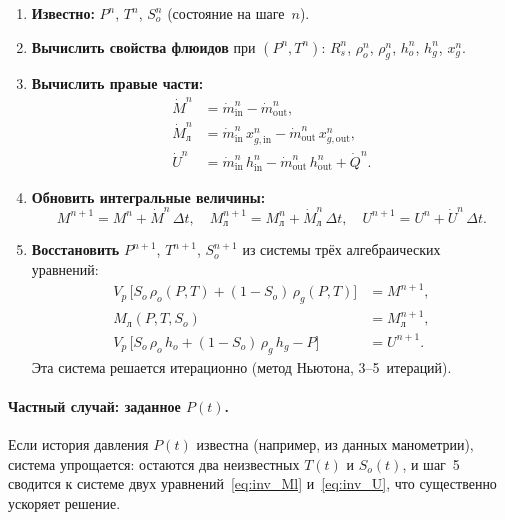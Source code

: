 \documentclass[12pt,a4paper]{article}
\begin{document}
\begin{enumerate}
  \item \textbf{Известно:} $P^n$, $T^n$, $S_o^n$ (состояние на шаге~$n$).

  \item \textbf{Вычислить свойства флюидов} при $(P^n, T^n)$:
        $R_s^n$, $\rho_o^n$, $\rho_g^n$, $h_o^n$, $h_g^n$, $x_g^n$.

  \item \textbf{Вычислить правые части:}
    \begin{align}
      \dot{M}^n &= \dot{m}_{\text{in}}^n - \dot{m}_{\text{out}}^n,
        \label{eq:rhs_M} \\
      \dot{M}_{\text{л}}^n &= \dot{m}_{\text{in}}^n\,x_{g,\text{in}}^n
        - \dot{m}_{\text{out}}^n\,x_{g,\text{out}}^n,
        \label{eq:rhs_Ml} \\
      \dot{U}^n &= \dot{m}_{\text{in}}^n\,h_{\text{in}}^n
        - \dot{m}_{\text{out}}^n\,h_{\text{out}}^n + \dot{Q}^n.
        \label{eq:rhs_U}
    \end{align}

  \item \textbf{Обновить интегральные величины:}
    \begin{equation}\label{eq:euler}
      M^{n+1} = M^n + \dot{M}^n\,\Delta t, \quad
      M_{\text{л}}^{n+1} = M_{\text{л}}^n + \dot{M}_{\text{л}}^n\,\Delta t, \quad
      U^{n+1} = U^n + \dot{U}^n\,\Delta t.
    \end{equation}

  \item \textbf{Восстановить} $P^{n+1}$, $T^{n+1}$, $S_o^{n+1}$ из
        системы трёх алгебраических уравнений:
    \begin{align}
      V_p\,\bigl[S_o\,\rho_o(P,T) + (1-S_o)\,\rho_g(P,T)\bigr] &= M^{n+1},
        \label{eq:inv_M} \\
      M_{\text{л}}(P,T,S_o) &= M_{\text{л}}^{n+1},
        \label{eq:inv_Ml} \\
      V_p\,\bigl[S_o\,\rho_o\,h_o + (1-S_o)\,\rho_g\,h_g - P\bigr] &= U^{n+1}.
        \label{eq:inv_U}
    \end{align}
        Эта система решается итерационно (метод Ньютона, 3--5~итераций).
\end{enumerate}

\paragraph{Частный случай: заданное $P(t)$.}
Если история давления $P(t)$ известна (например, из данных манометрии),
система упрощается: остаются два неизвестных $T(t)$ и $S_o(t)$,
и шаг~5 сводится к системе двух уравнений~\eqref{eq:inv_Ml}
и~\eqref{eq:inv_U}, что существенно ускоряет решение.
\end{document}

